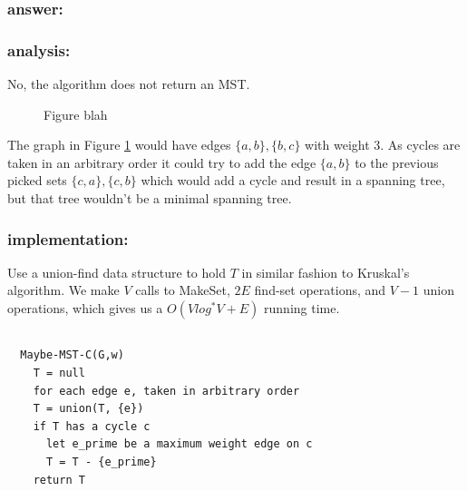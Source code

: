 \documentclass[titlepage]{article}
\theoremstyle{definition}
\begin{document}
  \subsubsection{answer: }
  \subsubsection{analysis: }
    No, the algorithm does not return an MST. 
      
    \usetikzlibrary{arrows}
    \begin{figure}
      \begin{center}
      \end{center}
    \caption{Figure blah}
    \label{fig:mst}
    \end{figure}

    The graph in Figure \ref{fig:mst} would have edges $\{a,b\}, \{b,c\}$ with
    weight 3. As cycles are taken in an arbitrary order it could try to add the
    edge $\{a,b\}$  to the previous picked sets $\{c,a\}, \{c,b\}$ which would add
    a cycle and result in a spanning tree, but that tree wouldn't be a minimal
    spanning tree. 

    \subsubsection{implementation:}
      Use a union-find data structure to hold $T$ in similar fashion to Kruskal's
      algorithm. We make $V$ calls to MakeSet, $2E$ find-set operations, and
      $V-1$ union operations, which gives us a $O(V log^* V + E)$ running time. 


\subsection{}
  \begin{lstlisting}
  Maybe-MST-C(G,w)
    T = null
    for each edge e, taken in arbitrary order
    T = union(T, {e})
    if T has a cycle c
      let e_prime be a maximum weight edge on c
      T = T - {e_prime}
    return T
  \end{lstlisting}
\end{document}

